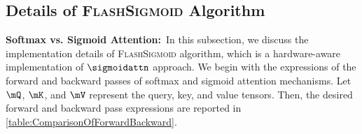 \subsection{Details of \textsc{FlashSigmoid} Algorithm}
\label{sec:DetailsOfFlashSigmoidAlgorithm}
\noindent \textbf{Softmax vs. Sigmoid Attention:}\ In this subsection, we discuss the implementation details of \textsc{FlashSigmoid} algorithm, which is a hardware-aware implementation of $\sigmoidattn$ approach. 
We begin with the expressions of the forward and backward passes of softmax and sigmoid attention mechanisms.
Let $\mQ$, $\mK$, and $\mV$ represent the query, key, and value tensors. 
Then, the desired forward and backward pass expressions are reported in \cref{table:ComparisonOfForwardBackward}.
\begin{table}[!h]
    \centering
    \begin{sc}
\end{sc}
\end{table}
